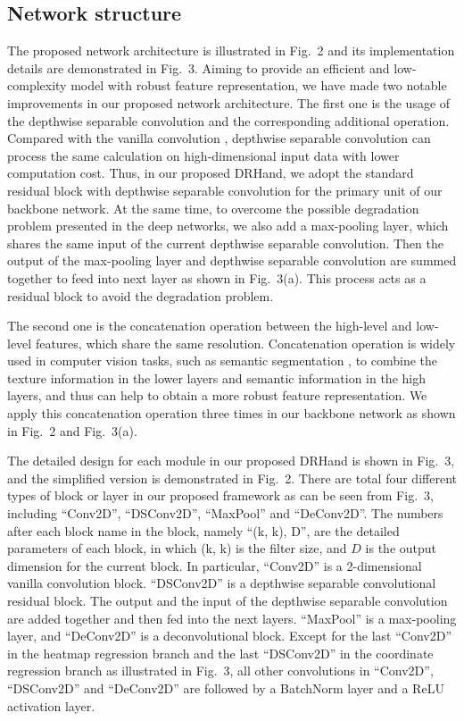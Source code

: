 \documentclass[11pt]{article}
\begin{document}
\subsection{Network structure}
The proposed network architecture is illustrated in Fig.\ 2 and its implementation details are demonstrated in Fig.\ 3. Aiming to provide an efficient and low-complexity model with robust feature representation, we have made two notable improvements in our proposed network architecture.
The first one is the usage of the depthwise separable convolution \cite{ref36} and the corresponding additional operation. Compared with the vanilla convolution \cite{ref36}, depthwise separable convolution can process the same calculation on high-dimensional input data with lower computation cost. Thus, in our proposed DRHand, we adopt the standard residual block \cite{ref37} with depthwise separable convolution for the primary unit of our backbone network. At the same time, to overcome the possible degradation problem presented in the deep networks, we also add a max-pooling layer, which shares the same input of the current depthwise separable convolution. Then the output of the max-pooling layer and depthwise separable convolution are summed together to feed into next layer as shown in Fig.\ 3(a). This process acts as a residual block to avoid the degradation problem.

The second one is the concatenation operation between the high-level and low-level features, which share the same resolution. Concatenation operation is widely used in computer vision tasks, such as semantic segmentation \cite{ref38,ref39}, to combine the texture information in the lower layers and semantic information in the high layers, and thus can help to obtain a more robust feature representation. We apply this concatenation operation three times in our backbone network as shown in Fig.\ 2 and Fig.\ 3(a).

The detailed design for each module in our proposed DRHand is shown in Fig.\ 3, and the simplified version is demonstrated in Fig.\ 2. There are total four different types of block or layer in our proposed framework as can be seen from Fig.\ 3, including ``Conv2D'', ``DSConv2D'', ``MaxPool'' and ``DeConv2D''. The numbers after each block name in the block, namely ``(k, k), D'', are the detailed parameters of each block, in which (k, k) is the filter size, and $D$ is the output dimension for the current block. In particular, ``Conv2D'' is a 2-dimensional vanilla convolution block. ``DSConv2D'' is a depthwise separable convolutional residual block. The output and the input of the depthwise separable convolution are added together and then fed into the next layers. ``MaxPool'' is a max-pooling layer, and ``DeConv2D'' is a deconvolutional block. Except for the last ``Conv2D'' in the heatmap regression branch and the last ``DSConv2D'' in the coordinate regression branch as illustrated in Fig.\ 3, all other convolutions in ``Conv2D'', ``DSConv2D'' and ``DeConv2D'' are followed by a BatchNorm layer and a ReLU activation layer.
\end{document}
